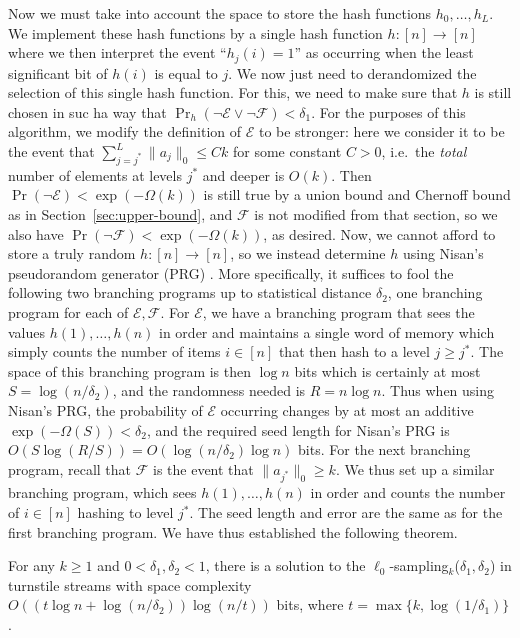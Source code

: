 Now we must take into account the space to store the hash functions $h_0,\ldots,h_L$. We implement these hash functions by a single hash function $h:[n]\rightarrow[n]$ where we then interpret the event ``$h_j(i) = 1$'' as occurring when the least significant bit of $h(i)$ is equal to $j$. We now just need to derandomized the selection of this single hash function. For this, we need to make sure that $h$ is still chosen in suc ha way that $\Pr_h(\neg\mathcal E \vee \neg\mathcal F) < \delta_1$. For the purposes of this algorithm, we modify the definition of $\mathcal E$ to be stronger: here we consider it to be the event that $\sum_{j=j^*}^L \|a_j\|_0 \le Ck$ for some constant $C>0$, i.e.\ the {\em total} number of elements at levels $j^*$ and deeper is $O(k)$. Then $\Pr(\neg \mathcal E) < \exp(-\Omega(k))$ is still true by a union bound and Chernoff bound as in Section~\ref{sec:upper-bound}, and $\mathcal F$ is not modified from that section, so we also have $\Pr(\neg\mathcal F) < \exp(-\Omega(k))$, as desired. Now, we cannot afford to store a truly random $h:[n]\rightarrow[n]$, so we instead determine $h$ using Nisan's pseudorandom generator (PRG) \cite{Nisan92}. More specifically, it suffices to fool the following two branching programs up to statistical distance $\delta_2$, one branching program for each of $\mathcal E, \mathcal F$. For $\mathcal E$, we have a branching program that sees the values $h(1),\ldots,h(n)$ in order and maintains a single word of memory which simply counts the number of items $i\in[n]$ that then hash to a level $j\ge j^*$. The space of this branching program is then $\log n$ bits which is certainly at most $S = \log(n/\delta_2)$, and the randomness needed is $R = n\log n$. Thus when using Nisan's PRG, the probability of $\mathcal E$ occurring changes by at most an additive $\exp(-\Omega(S)) < \delta_2$, and the required seed length for Nisan's PRG is $O(S\log(R/S)) = O(\log(n/\delta_2)\log n)$ bits. For the next branching program, recall that $\mathcal F$ is the event that $\|a_{j^*}\|_0 \ge k$. We thus set up a similar branching program, which sees $h(1),\ldots,h(n)$ in order and counts the number of $i\in[n]$ hashing to level $j^*$. The seed length and error are the same as for the first branching program. We have thus established the following theorem.

\begin{theorem}
For any $k\ge 1$ and $0<\delta_1,\delta_2<1$, there is a solution to the $\ell_0$-sampling$_k$($\delta_1,\delta_2$) in turnstile streams with space complexity $O((t\log n + \log(n/\delta_2))\log(n/t))$ bits, where $t = \max\{k, \log(1/\delta_1)\}$.
\end{theorem}